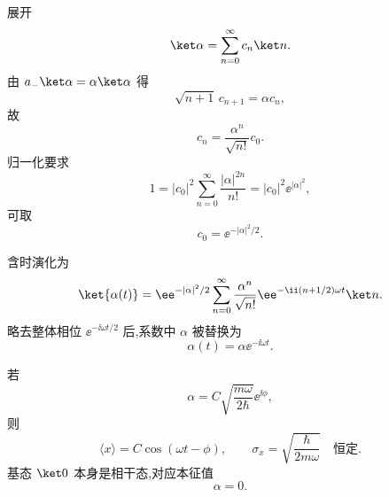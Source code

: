 \begin{question}
\begin{solution}
展开
\[
\ket\alpha=\sum_{n=0}^{\infty}c_n\ket n.
\]
由 $a_-\ket\alpha=\alpha\ket\alpha$ 得
\[
\sqrt{n+1}\,c_{n+1}=\alpha c_n,
\]
故
\[
\boxed{c_n=\frac{\alpha^n}{\sqrt{n!}}c_0.}
\]
归一化要求
\[
1=|c_0|^2\sum_{n=0}^{\infty}\frac{|\alpha|^{2n}}{n!}
=|c_0|^2\ee^{|\alpha|^2},
\]
可取
\[
\boxed{c_0=\ee^{-|\alpha|^2/2}.}
\]

含时演化为
\[
\ket{\alpha(t)}=\ee^{-|\alpha|^2/2}
\sum_{n=0}^{\infty}\frac{\alpha^n}{\sqrt{n!}}\ee^{-\ii(n+1/2)\omega t}\ket n.
\]
略去整体相位 $\ee^{-\ii\omega t/2}$ 后,系数中 $\alpha$ 被替换为
\[
\boxed{\alpha(t)=\alpha \ee^{-\ii\omega t}.}
\]

若
\[
\alpha=C\sqrt{\frac{m\omega}{2\hbar}}\ee^{\ii\phi},
\]
则
\[
\boxed{\langle x\rangle=C\cos(\omega t-\phi)},
\qquad
\boxed{\sigma_x=\sqrt{\frac{\hbar}{2m\omega}}}\quad\text{恒定}.
\]
基态 $\ket0$ 本身是相干态,对应本征值
\[
\boxed{\alpha=0.}
\]
\end{solution}
\end{question}

